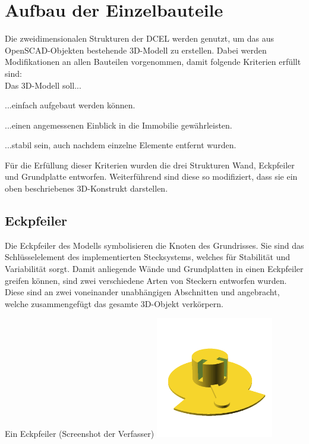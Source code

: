 \section{Aufbau der Einzelbauteile}
Die zweidimensionalen Strukturen der DCEL werden genutzt, um das aus OpenSCAD-Objekten bestehende 3D-Modell zu erstellen.
Dabei werden Modifikationen an allen Bauteilen vorgenommen, damit folgende Kriterien erfüllt sind:\\
Das 3D-Modell soll...
\begin{compactenum}
	\item ...einfach aufgebaut werden können.
	\item ...einen angemessenen Einblick in die Immobilie gewährleisten.
	\item ...stabil sein, auch nachdem einzelne Elemente entfernt wurden.
\end{compactenum}
Für die Erfüllung dieser Kriterien wurden die drei Strukturen Wand, Eckpfeiler und Grundplatte entworfen.
Weiterführend sind diese so modifiziert, dass sie ein oben beschriebenes 3D-Konstrukt darstellen.

\subsection{Eckpfeiler}
Die Eckpfeiler des Modells symbolisieren die Knoten des Grundrisses.
Sie sind das Schlüsselelement des implementierten Stecksystems, welches für Stabilität und Variabilität sorgt.
Damit anliegende Wände und Grundplatten in einen Eckpfeiler greifen können, sind zwei verschiedene Arten von Steckern entworfen wurden.
Diese sind an zwei voneinander unabhängigen Abschnitten  und  angebracht, welche zusammengefügt das gesamte 3D-Objekt verkörpern.
\begin{Bild}{Ein Eckpfeiler (Screenshot der Verfasser)}
	\includegraphics[height=200px]{Bilder/Untereinheit_Ecke}
\end{Bild}

